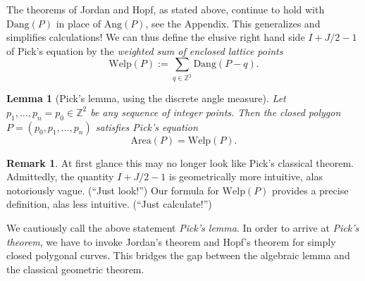 \documentclass[a4paper]{amsart}
\numberwithin{equation}{section}
\theoremstyle{plain}
\newtheorem{lemma}[theorem]{Lemma}
\theoremstyle{definition}
\newtheorem{remark}[theorem]{Remark}
\newcommand{\Z}{\mathbb{Z}}
\newcommand{\Area}{\mathrm{Area}}
\newcommand{\Ang}{\mathrm{Ang}}
\newcommand{\Dang}{\mathrm{Dang}}
\newcommand{\Welp}{\mathrm{Welp}}
\begin{document}
The theorems of Jordan and Hopf, as stated above, continue
to hold with $\Dang(P)$ in place of $\Ang(P)$, see the Appendix.
This generalizes and simplifies calculations!
We can thus define the elusive right hand side $I + J/2 - 1$ of Pick's equation
by the \emph{weighted sum of enclosed lattice points}
\[
\Welp(P) := \sum_{q \in \Z^2} \Dang(P-q) .
\]

\begin{lemma}[Pick's lemma, using the discrete angle measure]
  Let $p_1,\ldots,p_n=p_0 \in \Z^2$ be any sequence of integer points.
  Then the closed polygon $P = (p_0,p_1,\ldots,p_n)$ satisfies Pick's equation 
  \[
  \Area(P) = \Welp(P) .
  \]
\end{lemma}

\begin{remark}
  At first glance this may no longer look like Pick's classical theorem.
  Admittedly, the quantity $I + J/2 - 1$ is geometrically more intuitive,
  alas notoriously vague. (``Just look!'') %
  Our formula for $\Welp(P)$ provides a precise definition,
  alas less intuitive. (``Just calculate!'')
  
  We cautiously call the above statement \emph{Pick's lemma}.
  In order to arrive at \emph{Pick's theorem},
  we have to invoke Jordan's theorem and Hopf's theorem
  for simply closed polygonal curves.
  This bridges the gap between the algebraic lemma
  and the classical geometric theorem.
\end{remark}
\end{document}
